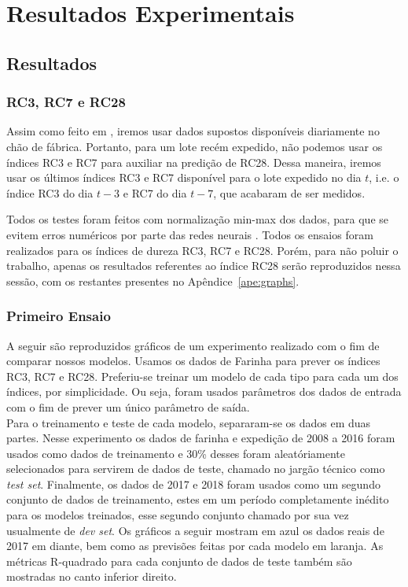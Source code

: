 \chapter{Resultados Experimentais }
\label{cap:resultados}

\section{Resultados}

\subsection{RC3, RC7 e RC28}

Assim como feito em \cite{greciaLin}, iremos usar dados supostos disponíveis diariamente no chão de fábrica. Portanto, para um lote recém expedido,
não podemos usar os índices RC3 e RC7 para auxiliar na predição de RC28. Dessa maneira, iremos usar os últimos índices RC3 e RC7 disponível para o lote expedido no dia $t$,
i.e. o índice RC3 do dia $t-3$ e RC7 do dia $t-7$, que acabaram de ser medidos. 



Todos os testes foram feitos com normalização min-max dos dados, para que se
evitem erros numéricos por parte das redes neurais \citep{dlbook}. Todos os ensaios
foram realizados para os índices de dureza RC3, RC7 e RC28. Porém, para não
poluir o trabalho, apenas os
resultados referentes ao índice RC28 serão reproduzidos nessa sessão, com os
restantes presentes no Apêndice~\ref{ape:graphs}.\\


\subsection{Primeiro Ensaio}
A seguir são reproduzidos gráficos de um experimento realizado com o fim de
comparar nossos modelos. Usamos os dados de Farinha para prever os índices RC3,
RC7 e RC28. Preferiu-se treinar um modelo de cada tipo para cada um dos
índices, por simplicidade. Ou seja, foram usados parâmetros dos dados de entrada
com o fim de prever um único parâmetro de saída. \\ 
Para o treinamento e teste de cada modelo, separaram-se os dados em duas partes. Nesse experimento os dados de farinha e expedição de 2008 a 2016 foram usados como dados de treinamento e 30\% desses foram aleatóriamente selecionados para servirem de dados de teste, chamado no jargão técnico como \textit{test set}. Finalmente, os dados de 2017 e 2018 foram usados como um segundo conjunto de dados de treinamento, estes em um período completamente inédito para os modelos treinados, esse segundo conjunto chamado por sua vez usualmente de \textit{dev set}. Os gráficos a seguir mostram em azul os dados reais de 2017 em diante, bem como as previsões feitas por cada modelo em laranja. As métricas R-quadrado para cada conjunto de dados de teste também são mostradas no canto inferior direito.

